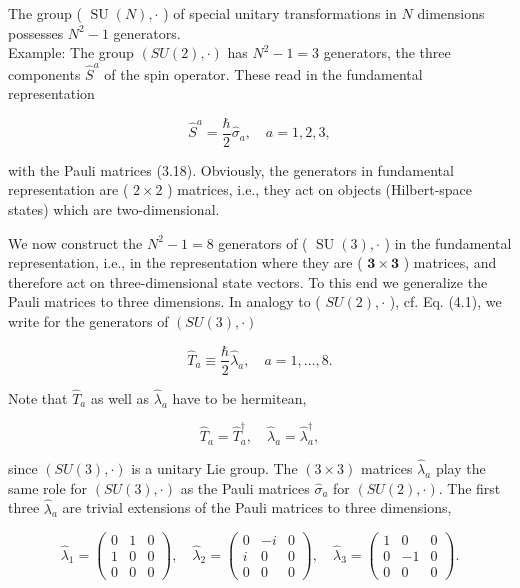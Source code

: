 \documentclass[10pt, letterpaper]{article}
\begin{document}
The group ( $\operatorname{SU}(N), \cdot$ ) of special unitary transformations in $N$ dimensions possesses $N^{2}-1$ generators.\\
Example: The group $(S U(2), \cdot)$ has $N^{2}-1=3$ generators, the three components $\hat{S}^{a}$ of the spin operator. These read in the fundamental representation

$$
\hat{S}^{a}=\frac{\hbar}{2} \hat{\sigma}_{a}, \quad a=1,2,3,
$$

with the Pauli matrices (3.18). Obviously, the generators in fundamental representation are ( $2 \times 2$ ) matrices, i.e., they act on objects (Hilbert-space states) which are two-dimensional.

We now construct the $N^{2}-1=8$ generators of ( $\operatorname{SU}(3), \cdot$ ) in the fundamental representation, i.e., in the representation where they are ( $\mathbf{3} \times \mathbf{3}$ ) matrices, and therefore act on three-dimensional state vectors. To this end we generalize the Pauli matrices to three dimensions. In analogy to ( $S U(2), \cdot$ ), cf. Eq. (4.1), we write for the generators of $(S U(3), \cdot)$

$$
\hat{T}_{a} \equiv \frac{\hbar}{2} \hat{\lambda}_{a}, \quad a=1, \ldots, 8 .
$$

Note that $\hat{T}_{a}$ as well as $\hat{\lambda}_{a}$ have to be hermitean,

$$
\hat{T}_{a}=\hat{T}_{a}^{\dagger}, \quad \hat{\lambda}_{a}=\hat{\lambda}_{a}^{\dagger},
$$

since $(S U(3), \cdot)$ is a unitary Lie group. The $(3 \times 3)$ matrices $\hat{\lambda}_{a}$ play the same role for $(S U(3), \cdot)$ as the Pauli matrices $\hat{\sigma}_{a}$ for $(S U(2), \cdot)$. The first three $\hat{\lambda}_{a}$ are trivial extensions of the Pauli matrices to three dimensions,

$$
\hat{\lambda}_{1}=\left(\begin{array}{lll}
0 & 1 & 0 \\
1 & 0 & 0 \\
0 & 0 & 0
\end{array}\right), \quad \hat{\lambda}_{2}=\left(\begin{array}{ccc}
0 & -i & 0 \\
i & 0 & 0 \\
0 & 0 & 0
\end{array}\right), \quad \hat{\lambda}_{3}=\left(\begin{array}{ccc}
1 & 0 & 0 \\
0 & -1 & 0 \\
0 & 0 & 0
\end{array}\right) .
$$
\end{document}

